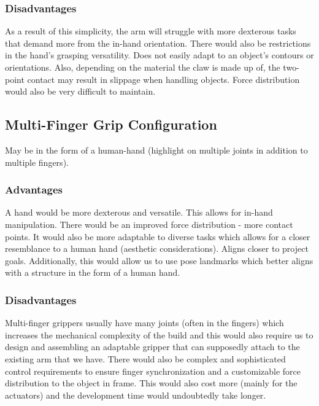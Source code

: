 \documentclass[document]{llncs}
\begin{document}
\subsubsection{Disadvantages}
As a result of this simplicity, the arm will struggle with more dexterous tasks that demand more from the in-hand orientation. There would also be restrictions in the hand's grasping versatility. Does not easily adapt to an object's contours or orientations. Also, depending on the material the claw is made up of, the two-point contact may result in slippage when handling objects. Force distribution would also be very difficult to maintain.

\subsection{Multi-Finger Grip Configuration}
May be in the form of a human-hand (highlight on multiple joints in addition to multiple fingers).

\subsubsection{Advantages}
A hand would be more dexterous and versatile. This allows for in-hand manipulation. There would be an improved force distribution - more contact points. It would also be more adaptable to diverse tasks which allows for a closer resemblance to a human hand (aesthetic considerations). Aligns closer to project goals. Additionally, this would allow us to use pose landmarks which better aligns with a structure in the form of a human hand.

\subsubsection{Disadvantages}
Multi-finger grippers usually have many joints (often in the fingers) which increases the mechanical complexity of the build and this would also require us to design and assembling an adaptable gripper that can supposedly attach to the existing arm that we have. There would also be complex and sophisticated control requirements to ensure finger synchronization and a customizable force distribution to the object in frame. This would also cost more (mainly for the actuators) and the development time would undoubtedly take longer. 
\end{document}
